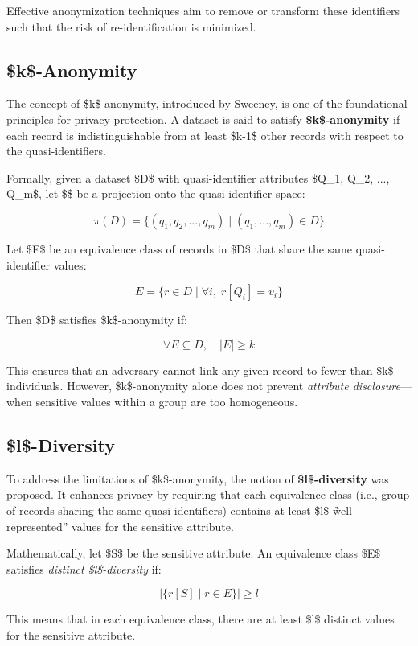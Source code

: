 \documentclass{article}
\begin{document}
Effective anonymization techniques aim to remove or transform these identifiers such that the risk of re-identification is minimized.

\subsection{\$k\$-Anonymity}

The concept of \$k\$-anonymity, introduced by Sweeney, is one of the foundational principles for privacy protection. A dataset is said to satisfy \textbf{\$k\$-anonymity} if each record is indistinguishable from at least \$k-1\$ other records with respect to the quasi-identifiers.

Formally, given a dataset \$D\$ with quasi-identifier attributes \$Q\_1, Q\_2, ..., Q\_m\$, let \$\pi\$ be a projection onto the quasi-identifier space:

$$
\pi(D) = \{ (q_1, q_2, ..., q_m) \mid (q_1, ..., q_m) \in D \}
$$

Let \$E\$ be an equivalence class of records in \$D\$ that share the same quasi-identifier values:

$$
E = \{ r \in D \mid \forall i, \; r[Q_i] = v_i \}
$$

Then \$D\$ satisfies \$k\$-anonymity if:

$$
\forall E \subseteq D, \quad |E| \geq k
$$

This ensures that an adversary cannot link any given record to fewer than \$k\$ individuals. However, \$k\$-anonymity alone does not prevent \textit{attribute disclosure}—when sensitive values within a group are too homogeneous.

\subsection{\$l\$-Diversity}

To address the limitations of \$k\$-anonymity, the notion of \textbf{\$l\$-diversity} was proposed. It enhances privacy by requiring that each equivalence class (i.e., group of records sharing the same quasi-identifiers) contains at least \$l\$ \`\`well-represented'' values for the sensitive attribute.

Mathematically, let \$S\$ be the sensitive attribute. An equivalence class \$E\$ satisfies \textit{distinct \$l\$-diversity} if:

$$
|\{ r[S] \mid r \in E \}| \geq l
$$

This means that in each equivalence class, there are at least \$l\$ distinct values for the sensitive attribute.
\end{document}
